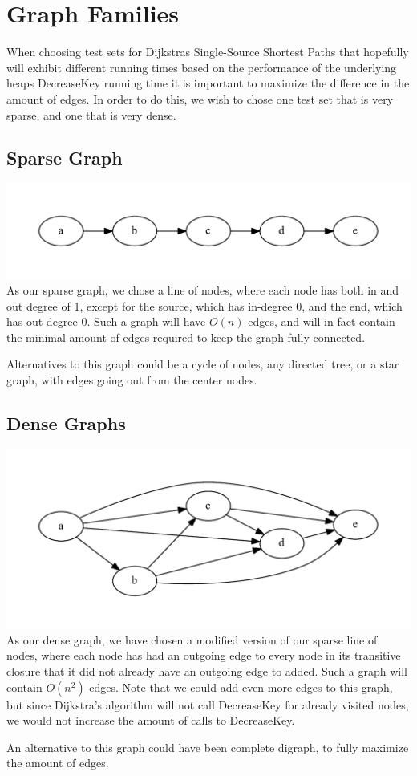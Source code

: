 \section{Graph Families}

When choosing test sets for Dijkstras Single-Source Shortest Paths that hopefully will exhibit different running times based on the performance of the underlying heaps DecreaseKey running time it is important to maximize the difference in the amount of edges.
In order to do this, we wish to chose one test set that is very sparse, and one that is very dense.

\subsection{Sparse Graph}
\includegraphics[width=\textwidth]{sparsegraph.pdf}
As our sparse graph, we chose a line of nodes, where each node has both in and out degree of 1, except for the source, which has in-degree 0, and the end, which has out-degree 0. Such a graph will have $O(n)$ edges, and will in fact contain the minimal amount of edges required to keep the graph fully connected.

Alternatives to this graph could be a cycle of nodes, any directed tree, or a star graph, with edges going out from the center nodes.

\subsection{Dense Graphs}
\includegraphics[width=\textwidth]{densegraph.pdf}
As our dense graph, we have chosen a modified version of our sparse line of nodes, where each node has had an outgoing edge to every node in its transitive closure that it did not already have an outgoing edge to added. Such a graph will contain $O(n^2)$ edges. Note that we could add even more edges to this graph, but since Dijkstra's algorithm will not call DecreaseKey for already visited nodes, we would not increase the amount of calls to DecreaseKey.

An alternative to this graph could have been complete digraph, to fully maximize the amount of edges.

